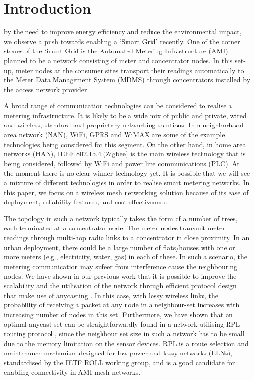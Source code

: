 \documentclass[conference]{IEEEtran}
\begin{document}
\IEEEpeerreviewmaketitle



\section{Introduction}


 by the need to improve energy efficiency
and reduce the environmental impact, we observe a push towards
enabling a `Smart Grid' recently. One of the corner stones of the Smart Grid
is the Automated Metering Infrastructure (AMI), planned to be a
network consisting of meter and concentrator nodes. In this set-up, meter nodes at the consumer sites transport their readings automatically to the Meter Data Management System (MDMS) through concentrators
installed by the access network provider.


A broad range of communication technologies can be considered to realise a metering infrastructure. It is likely to be a wide mix of public and private, wired and wireless, standard and proprietary networking solutions. In a neighborhood area network (NAN), WiFi, GPRS and WiMAX are some
of the example technologies being considered for this segment. On the other hand, in home area networks (HAN), IEEE 802.15.4 (Zigbee) is the main wireless technology that is being considered, followed by WiFi and power line communications (PLC). At the moment there is no clear winner technology yet. It is possible that we will see a mixture of different technologies in order to realise smart metering networks. In  this paper, we focus on a wireless mesh networking solution because of its ease of deployment, reliability features, and cost effectiveness.

The topology in such a network typically takes the form of a number of trees, each terminated at a concentrator node. The meter nodes transmit  meter readings through multi-hop radio links to a concentrator in close proximity. In an urban deployment, there could be a large number of flats/houses with one or more meters (e.g., electricity, water, gas) in each of these. In such a scenario, the metering communication may sufeer from interference cause the neighbouring nodes. We have shown in our previous work \cite{orpl} that it is possible to improve the scalability and the utilisation of the network through 
efficient protocol design that make use of anycasting \cite{anycast}. In this case, with lossy
wireless links, the probability of receiving a packet at any node in a neighbour-set increases with increasing number of nodes in this set. Furthermore, we have shown that an optimal anycast set can be straightforwardly found in a network utilising RPL routing protocol \cite{draft-ietf-rpl}, since the neighbour set size in such a network has to be small due to the memory limitation on the sensor devices. RPL is a route selection and maintenance  mechanism designed for low power and lossy networks (LLNs), standardised by the IETF ROLL working group, and is a good candidate for enabling connectivity in AMI mesh networks. 
\end{document}
